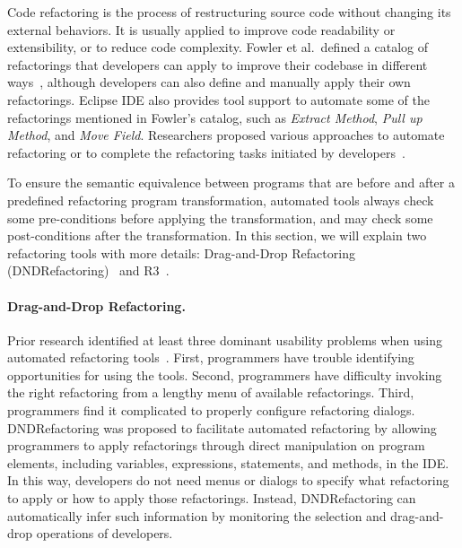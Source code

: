 \documentclass[runningheads,a4paper]{llncs}
\begin{document}
Code refactoring is the process of restructuring source code without changing its external behaviors. It is usually applied to improve code readability or extensibility, or to reduce code complexity. 
Fowler et al.~defined a catalog of refactorings that developers can apply to improve their codebase in different ways~\cite{1999:RID}, although developers can also define and manually apply their own refactorings. Eclipse IDE also provides tool support to automate some of the refactorings mentioned in Fowler's catalog, such as \emph{Extract Method}, \emph{Pull up Method}, and \emph{Move Field}. Researchers proposed various approaches to automate refactoring or to complete the refactoring tasks initiated by developers~\cite{Griswold:1992,Balazinska1999,Dig:2009,Ge:2012,Chen:2013,Lee:2013,Tsantalis2013:icsm,Meng:2015,Kim:2016}.


To ensure the semantic equivalence between programs that are before and after a predefined refactoring program transformation, automated tools always check some pre-conditions before applying the transformation, and may check some post-conditions after the transformation.
In this section, we will explain two refactoring tools with more details: Drag-and-Drop Refactoring (DNDRefactoring)~\cite{Lee:2013} and R3~\cite{Kim:2016}.

\paragraph{Drag-and-Drop Refactoring.} Prior research identified at least three dominant usability problems when using automated refactoring tools~\cite{OConnor:2005,Mealy:2007,Parnin:2008,Murphy-Hill:2008,Murphy-Hill:2011,Vakilian:2012}. First, programmers have trouble identifying opportunities for using the tools. Second, programmers have difficulty invoking the right refactoring from a lengthy menu of available refactorings. Third, programmers find it complicated to properly configure refactoring dialogs. DNDRefactoring was proposed to facilitate automated refactoring by allowing programmers to apply refactorings through direct manipulation on program elements, including variables, expressions, statements, and methods, in the IDE. In this way, developers do not need menus or dialogs to specify what refactoring to apply or how to apply those refactorings. Instead, DNDRefactoring can automatically infer such information by monitoring the selection and drag-and-drop operations of developers.
\end{document}
